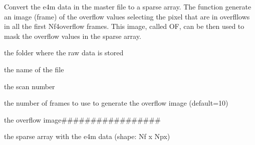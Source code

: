 \documentclass[letterpaper,10pt,english]{sphinxmanual}
\begin{document}
\begin{fulllineitems}
\label{\detokenize{index:ID10_tools.convert_dense_e4m_v1}}
\pysigstartsignatures
\pysiglinewithargsret
{}
{\sphinxparamcomma {}\sphinxparamcomma {}\sphinxparamcomma {}\sphinxparamcomma {}\sphinxparamcomma {}\sphinxparamcomma {}}
{}
\pysigstopsignatures
\sphinxAtStartPar
Convert the e4m data in the master file to a sparse array. The function generate an image (frame) of the overflow values selecting the pixel that are in overfllows in all the first Nf4overflow frames. This image, called OF, can be then used to mask the overflow values in the sparse array.
\begin{description}
\begin{description}
\sphinxAtStartPar
the folder where the raw data is stored

\sphinxAtStartPar
the name of the file

\sphinxAtStartPar
the scan number

\sphinxAtStartPar
the number of frames to use to generate the overflow image (default=10)

\end{description}

\begin{description}
\sphinxAtStartPar
the overflow image\#\#\#\#\#\#\#\#\#\#\#\#\#\#\#\#\#

\sphinxAtStartPar
the sparse array with the e4m data (shape: Nf x Npx)

\end{description}

\end{description}

\end{fulllineitems}

\end{document}
